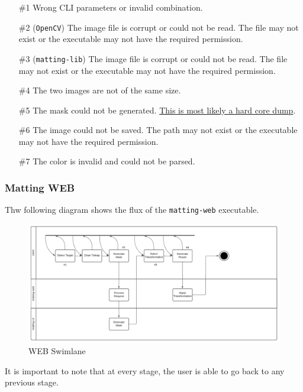 \documentclass[a4paper]{article}
\begin{document}
\begin{itemize}
    \item[\#1] Wrong \gls{CLI} parameters or invalid combination.
    \item[\#2] (\texttt{OpenCV}) The image file is corrupt or could not be read.
        The file may not exist or the executable may not have the required
        permission.
    \item[\#3] (\texttt{matting-lib}) The image file is corrupt or could not be read.
        The file may not exist or the executable may not have the required
        permission.
    \item[\#4] The two images are not of the same size.
    \item[\#5] The mask could not be generated. \underline{This is most likely a hard core dump}.
    \item[\#6] The image could not be saved. The path may not exist or the executable
        may not have the required permission.
    \item[\#7] The color is invalid and could not be parsed.
\end{itemize}

\pagebreak

\subsubsection{Matting WEB}

Thw following diagram shows the flux of the \texttt{matting-web} executable.

\begin{figure}[h]
    \includegraphics[width=\textwidth]{media/swimlane/swimlane3.pdf}
    \caption{WEB Swimlane}
\end{figure}

It is important to note that at every stage, the user is able
to go back to any previous stage.
\end{document}
